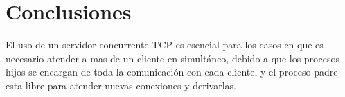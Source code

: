 \section{Conclusiones}
    El uso de un servidor concurrente TCP es esencial para los casos en que es necesario atender a mas de un cliente en simultáneo, debido a que los procesos hijos se encargan de toda la comunicación con cada cliente, y el proceso padre esta libre para atender nuevas conexiones y derivarlas.
\\
